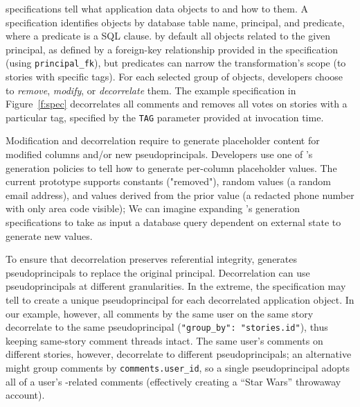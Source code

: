 \Xx specifications tell \sys what application data objects to \xx and how to \xx them.
%
A \xx specification identifies objects by database table name, principal, and
predicate, where a predicate is a SQL  clause.
%
\sys by default \xxs all objects related to the given principal, as defined by
a foreign-key relationship provided in the \xx specification (using
\texttt{principal\_fk}), but predicates can narrow the transformation's scope
(\eg to stories with specific tags).
%
For each selected group of objects, developers choose to
\emph{remove}, \emph{modify}, or \emph{decorrelate} them.
%
The example specification in Figure~\ref{f:spec} decorrelates all comments and removes all
votes on stories with a particular tag, specified by the \texttt{TAG} parameter provided
at invocation time.
%
%

Modification and decorrelation require \sys to generate placeholder content for
modified columns and/or new pseudoprincipals.  Developers use one of \sys's
generation policies to tell \sys how to generate per-column placeholder values.
%
The current prototype supports constants (\eg "removed"), random values (\eg a
random email address), and values derived from the prior value (\eg a redacted
phone number with only area code visible); 
%
We can imagine expanding \sys's generation specifications to take as input a
database query dependent on external state to generate new values.
%


%
To ensure that decorrelation preserves referential integrity, \sys generates
pseudoprincipals to replace the original principal. 
%
Decorrelation can use pseudoprincipals at different granularities.
In the extreme, the \xx specification may tell \sys to create a unique
pseudoprincipal for each decorrelated application object.
In our example, however, all comments by the same user on the same story
decorrelate to the same pseudoprincipal (\verb+"group_by": "stories.id"+), thus
keeping same-story comment threads intact.
%
The same user's comments on different stories, however, decorrelate to different
pseudoprincipals; an alternative might group comments by
\texttt{comments.user\_id}, so a single pseudoprincipal adopts all of a user's
-related comments (effectively creating a ``Star Wars'' throwaway account).

